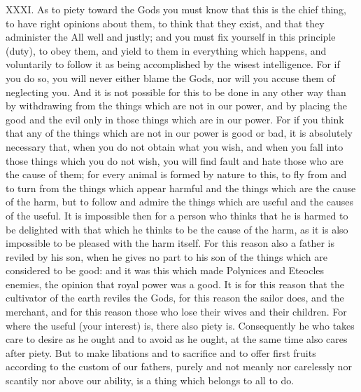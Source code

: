 XXXI. As to piety toward the Gods you must know that this is the chief thing, to have right opinions about them, to think that they exist, and that they administer the All well and justly; and you must fix yourself in this principle (duty), to obey them, and yield to them in everything which happens, and voluntarily to follow it as being accomplished by the wisest intelligence. For if you do so, you will never either blame the Gods, nor will you accuse them of neglecting you. And it is not possible for this to be done in any other way than by withdrawing from the things which are not in our power, and by placing the good and the evil only in those things which are in our power. For if you think that any of the things which are not in our power is good or bad, it is absolutely necessary that, when you do not obtain what you wish, and when you fall into those things which you do not wish, you will find fault and hate those who are the cause of them; for every animal is formed by nature to this, to fly from and to turn from the things which appear harmful and the things which are the cause of the harm, but to follow and admire the things which are useful and the causes of the useful. It is impossible then for a person who thinks that he is harmed to be delighted with that which he thinks to be the cause of the harm, as it is also impossible to be pleased with the harm itself. For this reason also a father is reviled by his son, when he gives no part to his son of the things which are considered to be good: and it was this which made Polynices and Eteocles enemies, the opinion that royal power was a good. It is for this reason that the cultivator of the earth reviles the Gods, for this reason the sailor does, and the merchant, and for this reason those who lose their wives and their children. For where the useful (your interest) is, there also piety is. Consequently he who takes care to desire as he ought and to avoid as he ought, at the same time also cares after piety. But to make libations and to sacrifice and to offer first fruits according to the custom of our fathers, purely and not meanly nor carelessly nor scantily nor above our ability, is a thing which belongs to all to do.



